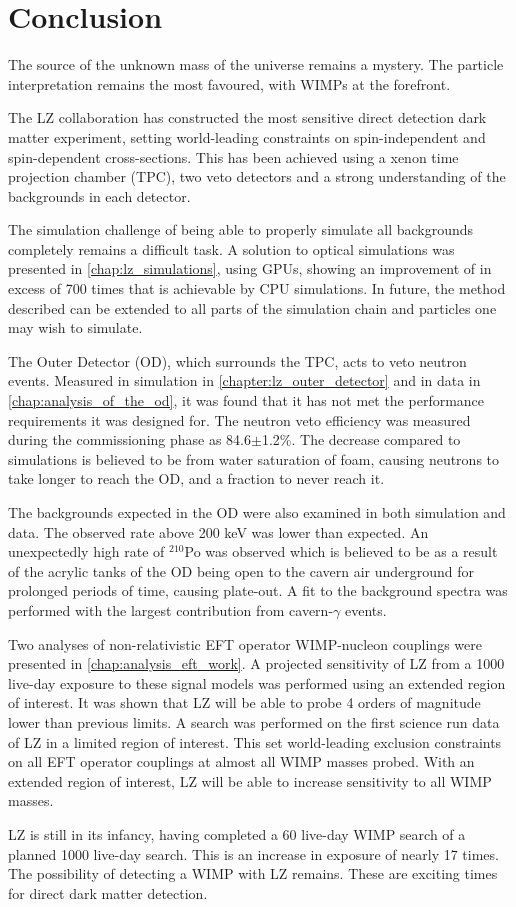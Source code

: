 \chapter{Conclusion}
\label{chap:conclusion}
\par
The source of the unknown mass of the universe remains a mystery.
The particle interpretation remains the most favoured, with WIMPs at the forefront.
\par
The LZ collaboration has constructed the most sensitive direct detection dark matter experiment, setting world-leading constraints on spin-independent and spin-dependent cross-sections.
This has been achieved using a xenon time projection chamber (TPC), two veto detectors and a strong understanding of the backgrounds in each detector.

\par
The simulation challenge of being able to properly simulate all backgrounds completely remains a difficult task.
A solution to optical simulations was presented in \autoref{chap:lz_simulations}, using GPUs, showing an improvement of in excess of 700 times that is achievable by CPU simulations.
In future, the method described can be extended to all parts of the simulation chain and particles one may wish to simulate.

\par
The Outer Detector (OD), which surrounds the TPC, acts to veto neutron events.
Measured in simulation in \autoref{chapter:lz_outer_detector} and in data in \autoref{chap:analysis_of_the_od}, it was found that it has not met the performance requirements it was designed for.
The neutron veto efficiency was measured during the commissioning phase as 84.6$\pm$1.2\%.
The decrease compared to simulations is believed to be from water saturation of foam, causing neutrons to take longer to reach the OD, and a fraction to never reach it.
\par
The backgrounds expected in the OD were also examined in both simulation and data.
The observed rate above 200 keV was lower than expected.
An unexpectedly high rate of ${}^{210}$Po was observed which is believed to be as a result of the acrylic tanks of the OD being open to the cavern air underground for prolonged periods of time, causing plate-out.
A fit to the background spectra was performed with the largest contribution from cavern-$\gamma$ events.

\par
Two analyses of non-relativistic EFT operator WIMP-nucleon couplings were presented in \autoref{chap:analysis_eft_work}.
A projected sensitivity of LZ from a 1000 live-day exposure to these signal models was performed using an extended region of interest.
It was shown that LZ will be able to probe 4 orders of magnitude lower than previous limits.
A search was performed on the first science run data of LZ in a limited region of interest.
This set world-leading exclusion constraints on all EFT operator couplings at almost all WIMP masses probed.
With an extended region of interest, LZ will be able to increase sensitivity to all WIMP masses.

\par
LZ is still in its infancy, having completed a 60 live-day WIMP search of a planned 1000 live-day search.
This is an increase in exposure of nearly 17 times.
The possibility of detecting a WIMP with LZ remains.
These are exciting times for direct dark matter detection.
